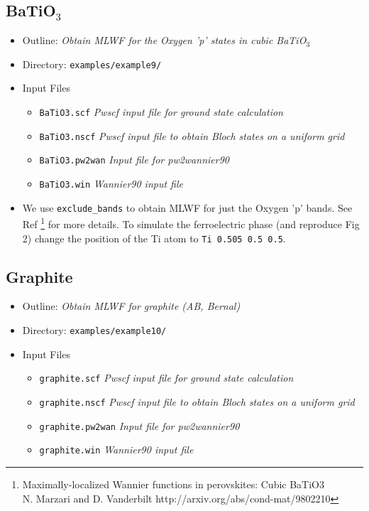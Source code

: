 \documentclass[a4paper,11pt,twoside]{article}
\begin{document}
\subsection*{BaTiO$_3$}
\begin{itemize}
\item{Outline: \it{Obtain MLWF for the Oxygen 'p' states in cubic BaTiO$_3$}}
\item{Directory: {\tt examples/example9/}}
\item{Input Files}
\begin{itemize}
\item{ {\tt BaTiO3.scf}  {\it Pwscf input file for ground state calculation}}
\item{ {\tt BaTiO3.nscf}  {\it Pwscf input file to obtain Bloch states on a uniform grid}}
\item{ {\tt BaTiO3.pw2wan}  {\it Input file for pw2wannier90}}
\item{ {\tt BaTiO3.win}  {\it Wannier90 input file}}
\end{itemize}
\item{We use {\tt exclude\_bands} to obtain MLWF for just the Oxygen 'p' bands. See Ref \footnote{Maximally-localized Wannier functions in perovskites: Cubic BaTiO3\\
N. Marzari and D. Vanderbilt http://arxiv.org/abs/cond-mat/9802210} for more details. To simulate the ferroelectric phase (and reproduce Fig 2) change the position of the Ti atom to {\tt Ti 0.505 0.5 0.5}.} 
\end{itemize}

\subsection*{Graphite}
\begin{itemize}
\item{Outline: \it{Obtain MLWF for graphite (AB, Bernal)}}
\item{Directory: {\tt examples/example10/}}
\item{Input Files}
\begin{itemize}
\item{ {\tt graphite.scf}  {\it Pwscf input file for ground state calculation}}
\item{ {\tt graphite.nscf}  {\it Pwscf input file to obtain Bloch states on a uniform grid}}
\item{ {\tt graphite.pw2wan}  {\it Input file for pw2wannier90}}
\item{ {\tt graphite.win}  {\it Wannier90 input file}}
\end{itemize}
\end{itemize}
\end{document}
